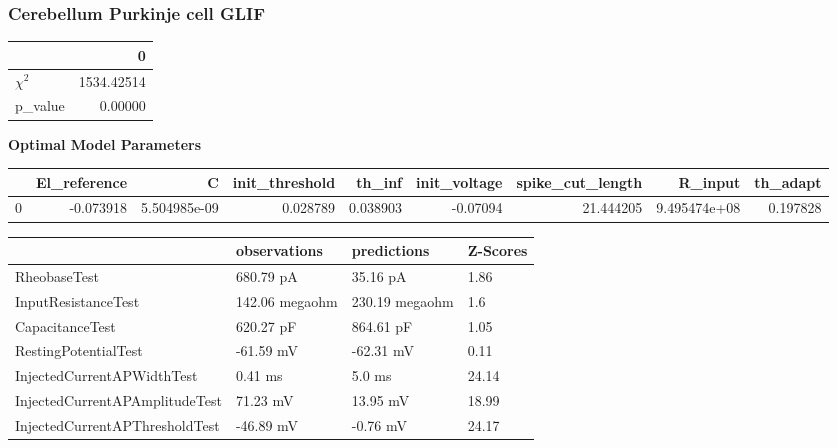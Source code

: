 \subsubsection{Cerebellum Purkinje cell GLIF}\begin{tabular}{lr}
\toprule
{} &           0 \\
\midrule
$\chi^{2}$ &  1534.42514 \\
p\_value    &     0.00000 \\
\bottomrule
\end{tabular}
\textbf{Optimal Model Parameters} \begin{tabular}{lrrrrrrrr}
\toprule
{} &  El\_reference &             C &  init\_threshold &    th\_inf &  init\_voltage &  spike\_cut\_length &       R\_input &  th\_adapt \\
\midrule
0 &     -0.073918 &  5.504985e-09 &        0.028789 &  0.038903 &      -0.07094 &         21.444205 &  9.495474e+08 &  0.197828 \\
\bottomrule
\end{tabular}
\begin{tabular}{llll}
\toprule
{} &    observations &     predictions & Z-Scores \\
\midrule
RheobaseTest                   &       680.79 pA &        35.16 pA &     1.86 \\
InputResistanceTest            &  142.06 megaohm &  230.19 megaohm &      1.6 \\
CapacitanceTest                &       620.27 pF &       864.61 pF &     1.05 \\
RestingPotentialTest           &       -61.59 mV &       -62.31 mV &     0.11 \\
InjectedCurrentAPWidthTest     &         0.41 ms &          5.0 ms &    24.14 \\
InjectedCurrentAPAmplitudeTest &        71.23 mV &        13.95 mV &    18.99 \\
InjectedCurrentAPThresholdTest &       -46.89 mV &        -0.76 mV &    24.17 \\
\bottomrule
\end{tabular}
